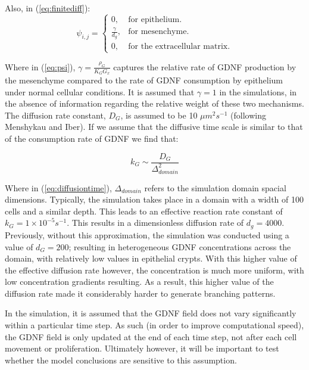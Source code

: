 \documentclass[pdftex,10pt,a4paper]{article}
\begin{document}
Also, in (\ref{eq:finitediff}):
\begin{equation} \label{eq:psi}
\psi_{i,j} =\begin{cases}
0, & \text{for epithelium}.\\
\frac{\gamma}{d_g}, & \text{for mesenchyme}.\\
0, & \text{for the extracellular matrix}.
\end{cases}
\end{equation}

Where in (\ref{eq:psi}), $\gamma = \frac{\rho_G}{K_G G_x}$ captures the relative rate of GDNF production by the mesenchyme compared to the rate of GDNF consumption by epithelium under normal cellular conditions. It is assumed that $\gamma = 1$ in the simulations, in the absence of information regarding the relative weight of these two mechanisms. The diffusion rate constant, $D_G$, is assumed to be 10 $\mu m^2 s^{-1}$ (following Menshykau and Iber). If we assume that the diffusive time scale is similar to that of the consumption rate of GDNF we find that:

\begin{equation}\label{eq:diffusiontime}
k_G \sim \frac{D_G}{\Delta_{domain}^2} 
\end{equation}

Where in (\ref{eq:diffusiontime}), $\Delta_{domain}$ refers to the simulation domain spacial dimensions. Typically, the simulation takes place in a domain with a width of 100 cells and a similar depth. This leads to an effective reaction rate constant of $k_G = 1 \times 10^{-5} s^{-1}$. This results in a dimensionless diffusion rate of $d_g = 4000$. Previously, without this approximation, the simulation was conducted using a value of $d_G = 200$; resulting in heterogeneous GDNF concentrations across the domain, with relatively low values in epithelial crypts. With this higher value of the effective diffusion rate however, the concentration is much more uniform, with low concentration gradients resulting. As a result, this higher value of the diffusion rate made it considerably harder to generate branching patterns.

In the simulation, it is assumed that the GDNF field does not vary significantly within a particular time step. As such (in order to improve computational speed), the GDNF field is only updated at the end of each time step, not after each cell movement or proliferation. Ultimately however, it will be important to test whether the model conclusions are sensitive to this assumption.
\end{document}
